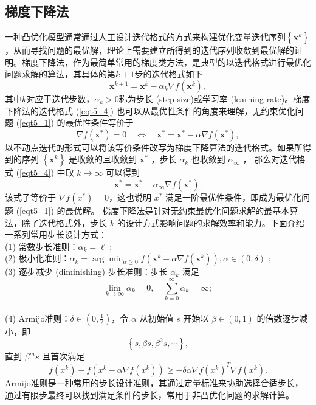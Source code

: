 \subsection{梯度下降法}
一种凸优化模型通常通过人工设计迭代格式的方式来构建优化变量迭代序列$\left\{\bm{x}^{k}\right\}$，从而寻找问题的最优解，理论上需要建立所得到的迭代序列收敛到最优解的证明\cite{6302929}。梯度下降法，作为最简单常用的梯度类方法，是典型的以迭代格式进行最优化问题求解的算法，其具体的第$k+1$步的迭代格式如下:
\begin{equation}
    \bm{x}^{k+1}=\bm{x}^{k}-\alpha_{k} \nabla f\left(\bm{x}^{k}\right),
    \label{eqt5_4}
\end{equation}
其中$k$对应于迭代步数，$\alpha_{k}>0$称为步长 (step-size)或学习率 (learning rate)。梯度下降法的迭代格式 (\ref{eqt5_4}) 也可以从最优性条件的角度来理解，无约束优化问题 (\ref{eqt5_1}) 的最优性条件等价于
\begin{equation}
    \nabla f\left(\bm{x}^{*}\right)=0 \quad \Leftrightarrow \quad \bm{x}^{*}=\bm{x}^{*}-\alpha \nabla f\left(\bm{x}^{*}\right),
    \nonumber
\end{equation}
以不动点迭代的形式可以将该等价条件改写为梯度下降算法的迭代格式。如果所得到的序列 $\left\{\bm{x}^{k}\right\}$ 是收敛的且收敛到 $\bm{x}^{*}$ ，步长 $\alpha_{k}$ 也收敛到 $\alpha_{\infty}$ ， 那么对迭代格式 (\ref{eqt5_4}) 中取 $k \rightarrow \infty$ 可以得到
\begin{equation}
    \bm{x}^{*}=\bm{x}^{*}-\alpha_{\infty} \nabla f\left(\bm{x}^{*}\right) 
    \text {.}
    \nonumber
\end{equation}
该式子等价于 $\nabla f\left(x^{*}\right)=0$，这也说明 $x^{*}$ 满足一阶最优性条件，即成为最优化问题 (\ref{eqt5_1}) 的最优解。
梯度下降法是针对无约束最优化问题求解的最基本算法，除了迭代格式外，步长 $k$ 的设计方式影响问题的求解效率和能力。下面介绍一系列常用步长设计方式\cite{2009Accelerated}：
\\ (1) 常数步长准则：$\alpha_{k}=\ell$ ;
\\ (2) 极小化准则：$ \alpha_{k}=\arg \min _{\alpha \geq 0} f\left(\bm{x}^{k}-\alpha \nabla f\left(\bm{x}^{k}\right)\right), \alpha \in(0, \delta)$ ;
\\ (3) 逐步减少 (diminishing) 步长准则：步长  $\alpha_{k}$  满足
\begin{equation}
    \lim _{k \rightarrow \infty} \alpha_{k}=0, \quad \sum_{k=0}^{\infty} \alpha_{k}=\infty ;
    \nonumber
\end{equation}
\\ (4) Armijo\cite{1999Convergence}准则：$\delta \in\left(0, \frac{1}{2}\right)$，令 $\alpha$ 从初始值 $s$ 开始以 $\beta \in(0, 1)$ 的倍数逐步减小，即
\begin{equation}
    \left\{s, \beta s, \beta^{2} s, \cdots\right\} ,
    \nonumber
\end{equation}
直到 $\beta^{m} s$ 且首次满足
\begin{equation}
    f\left(x^{k}\right)-f\left(x^{k}-\alpha \nabla f\left(x^{k}\right)\right) \geq-\delta \alpha \nabla f\left(x^{k}\right)^{T} \nabla f\left(x^{k}\right) .
    \nonumber
\end{equation}
Armijo准则是一种常用的步长设计准则\cite{1999Convergence}，其通过定量标准来协助选择合适步长，通过有限步最终可以找到满足条件的步长，常用于非凸优化问题的求解计算。


